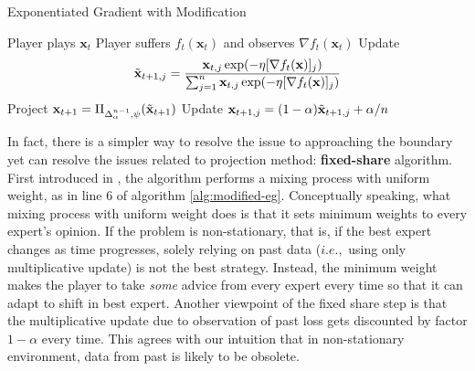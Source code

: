 \documentclass[12pt, a4paper]{report}
\begin{document}
\begin{algorithm}
\caption{Exponentiated Gradient with Modification} \label{alg:modified-eg}
\begin{algorithmic}[1]
\State Player plays $\mathbf{x}_t$
\State Player suffers $f_t(\mathbf{x}_t)$ and observes $\nabla f_t(\mathbf{x}_t)$
\State Update 
\[\Tilde{\mathbf{x}}_{t+1, j} = \frac{\mathbf{x}_{t,j} \exp(-\eta [\nabla f_t(\mathbf{x})]_j)}{\sum_{j=1}^n \mathbf{x}_{t, j} \exp(-\eta [\nabla f_t(\mathbf{x})]_j)}
\]
\Statex [Projection]
\State Project $\mathbf{x}_{t+1} = \Pi_{\Delta_{\alpha}^{n-1}, \psi}(\Tilde{\mathbf{x}}_{t+1})$
\State Update $\mathbf{x}_{t+1, j} = (1 - \alpha) \Tilde{\mathbf{x}}_{t+1, j} + \alpha/n $ 
\EndFor
\end{algorithmic}
\end{algorithm}

In fact, there is a simpler way to resolve the issue to approaching the boundary yet can resolve the issues related to projection method: \textbf{fixed-share} algorithm. First introduced in \cite{Herbster1995TrackingTB}, the algorithm performs a mixing process with uniform weight, as in line 6 of algorithm \ref{alg:modified-eg}. Conceptually speaking, what mixing process with uniform weight does is that it sets minimum weights to every expert's opinion. If the problem is non-stationary, that is, if the best expert changes as time progresses, solely relying on past data ($i.e.,$ using only multiplicative update) is not the best strategy. Instead, the minimum weight makes the player to take \textit{some} advice from every expert every time so that it can adapt to shift in best expert. Another viewpoint of the fixed share step is that the multiplicative update due to observation of past loss gets discounted by factor $1 - \alpha$ every time. This agrees with our intuition that in non-stationary environment, data from past is likely to be obsolete.
\end{document}
